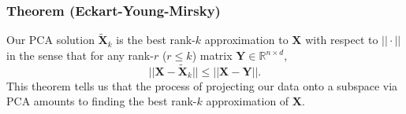 \documentclass{article}
\begin{document}
\subsubsection*{Theorem (Eckart-Young-Mirsky)}
Our PCA solution $\widetilde{\textbf{X}}_k$ is the best rank-$k$ approximation to $\textbf{X}$ with respect to $||\cdot||$ in the sense that for any rank-$r$ ($r \leq k$) matrix $\textbf{Y} \in \mathbb{R}^{n \times d}$, 
\[
||\textbf{X} - \widetilde{\textbf{X}}_k|| \leq ||\textbf{X} - \textbf{Y}||.
\]
This theorem tells us that the process of projecting our data onto a subspace via PCA amounts to finding the best rank-$k$ approximation of $\textbf{X}$. 
\end{document}
